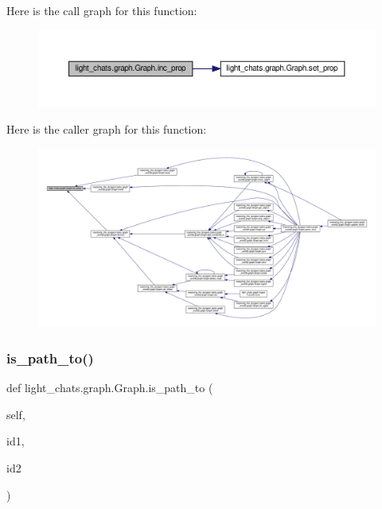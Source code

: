 Here is the call graph for this function\+:
\nopagebreak
\begin{figure}[H]
\begin{center}
\leavevmode
\includegraphics[width=350pt]{classlight__chats_1_1graph_1_1Graph_a871d833484089923fa5d1d4bb357ec7a_cgraph}
\end{center}
\end{figure}
Here is the caller graph for this function\+:
\nopagebreak
\begin{figure}[H]
\begin{center}
\leavevmode
\includegraphics[width=350pt]{classlight__chats_1_1graph_1_1Graph_a871d833484089923fa5d1d4bb357ec7a_icgraph}
\end{center}
\end{figure}
\mbox{\label{classlight__chats_1_1graph_1_1Graph_a04cfd7a5cc3c2df0c1bfec920d89d84c}} 
\subsubsection{\texorpdfstring{is\+\_\+path\+\_\+to()}{is\_path\_to()}}
{\footnotesize\ttfamily def light\+\_\+chats.\+graph.\+Graph.\+is\+\_\+path\+\_\+to (\begin{DoxyParamCaption}\item[{}]{self,  }\item[{}]{id1,  }\item[{}]{id2 }\end{DoxyParamCaption})}

